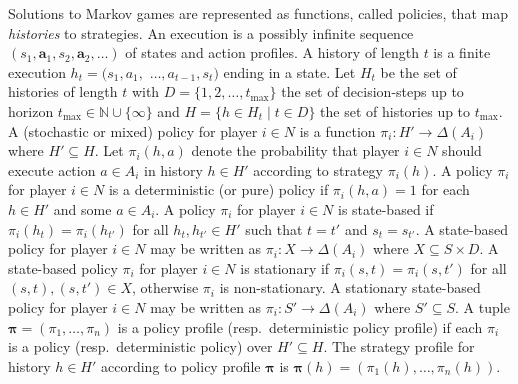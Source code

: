 \documentclass[10pt]{article}
\theoremstyle{plain}
\newcommand{\vect}[1]{\bm{#1}}
\begin{document}
Solutions to Markov games are represented as functions, called policies, that map \emph{histories} to strategies.
An execution is a possibly infinite sequence $(s_{1}, \vect{a}_{1}, s_{2}, \vect{a}_{2}, \dots)$ of states and action profiles.
A history of length $t$ is a finite execution $h_{t} = (s_{1}, a_{1},$ $\dots, a_{t-1}, s_{t})$ ending in a state.
Let $H_{t}$ be the set of histories of length $t$ with $D = \{ 1, 2, \dots, t_{\max} \}$ the set of decision-steps up to horizon $t_{\max} \in \mathbb{N} \cup \{ \infty \}$ and $H = \{ h \in H_{t} \mid t \in D \}$ the set of histories up to $t_{\max}$.
A (stochastic or mixed) policy for player $i \in N$ is a function $\pi_{i} : H' \to \Delta(A_{i})$ where $H' \subseteq H$.
Let $\pi_{i}(h, a)$ denote the probability that player $i \in N$ should execute action $a \in A_{i}$ in history $h \in H'$ according to strategy $\pi_{i}(h)$.
A policy $\pi_{i}$ for player $i \in N$ is a deterministic (or pure) policy if $\pi_{i}(h, a) = 1$ for each $h \in H'$ and some $a \in A_{i}$.
A policy $\pi_{i}$ for player $i \in N$ is state-based if $\pi_{i}(h_{t}) = \pi_{i}(h_{t'})$ for all $h_{t}, h_{t'} \in H'$ such that $t = t'$ and $s_{t} = s_{t'}$.
A state-based policy for player $i \in N$ may be written as $\pi_{i} : X \to \Delta(A_{i})$ where $X \subseteq S \times D$.
A state-based policy $\pi_{i}$ for player $i \in N$ is stationary if $\pi_{i}(s, t) = \pi_{i}(s, t')$ for all $(s, t), (s, t') \in X$, otherwise $\pi_{i}$ is non-stationary.
A stationary state-based policy for player $i \in N$ may be written as $\pi_{i} : S' \to \Delta(A_{i})$ where $S' \subseteq S$.
A tuple $\vect{\pi} = \left( \pi_{1}, \dots, \pi_{n} \right)$ is a policy profile (resp.\ deterministic policy profile) if each $\pi_{i}$ is a policy (resp.\ deterministic policy) over $H' \subseteq H$.
The strategy profile for history $h \in H'$ according to policy profile $\vect{\pi}$ is $\vect{\pi}(h) = \left( \pi_{1}(h), \dots, \pi_{n}(h) \right)$.
\end{document}
